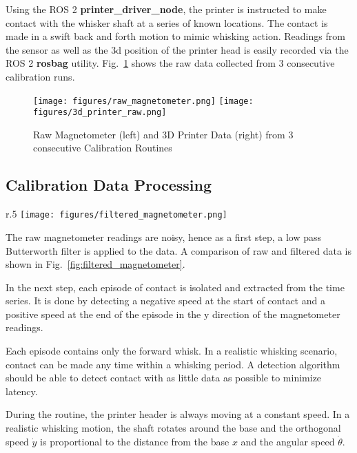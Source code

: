 \documentclass[runningheads]{llncs}
\begin{document}
Using the ROS 2 \textbf{printer\_driver\_node}, the printer is instructed to make contact with the whisker shaft at a series of known locations. The contact is made in a swift back and forth motion to mimic whisking action. Readings from the sensor as well as the 3d position of the printer head is easily recorded via the ROS 2 \textbf{rosbag} utility. Fig.~\ref{fig:calibration_routine} shows the raw data collected from 3 consecutive calibration runs.

\begin{figure}
    \centering
    \texttt{[image: figures/raw\_magnetometer.png]}
    \texttt{[image: figures/3d\_printer\_raw.png]}
    \caption{Raw Magnetometer (left) and 3D Printer Data (right) from 3 consecutive Calibration Routines}
    \label{fig:calibration_routine}
\end{figure}

\vspace{-10pt}

\subsection{Calibration Data Processing}\label{sec:calibration_data_analysis}

\begin{wrapfigure}{r}{.5\textwidth}
    \centering
    \texttt{[image: figures/filtered\_magnetometer.png]}
    \caption{Raw and Filtered Magnetometer Reading in the X Axis }
    \label{fig:filtered_magnetometer}
\end{wrapfigure}

The raw magnetometer readings are noisy, hence as a first step, a low pass Butterworth filter is applied to the data. A comparison of raw and filtered data is shown in Fig.~\ref{fig:filtered_magnetometer}.

In the next step, each episode of contact is isolated and extracted from the time series. It is done by detecting a negative speed at the start of contact and a positive speed at the end of the episode in the y direction of the magnetometer readings.

Each episode contains only the forward whisk. In a realistic whisking scenario, contact can be made any time within a whisking period. A detection algorithm should be able to detect contact with as little data as possible to minimize latency.

During the routine, the printer header is always moving at a constant speed. In a realistic whisking motion, the shaft rotates around the base and the orthogonal speed \(\dot{y}\) is proportional to the distance from the base \(x\) and the angular speed \(\dot{\theta}\).
\end{document}
